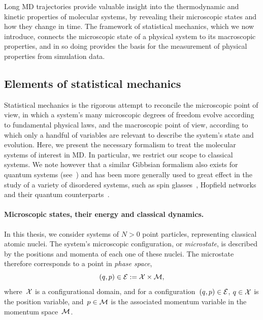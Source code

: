 Long MD trajectories provide valuable insight into the thermodynamic and kinetic properties of molecular systems, by revealing their microscopic states and how they change in time.
The framework of statistical mechanics, which we now introduce, connects the microscopic state of a physical system to its macroscopic properties, and in so doing provides the basis for the measurement of physical properties from simulation data.

\subsection{Elements of statistical mechanics}
Statistical mechanics is the rigorous attempt to reconcile the microscopic point of view, in which a system's many microscopic degrees of freedom evolve according to fundamental physical laws, and the macroscopic point of view, according to which only a handful of variables are relevant to describe the system's state and evolution.
Here, we present the necessary formalism to treat the molecular systems of interest in MD. In particular, we restrict our scope to classical systems.
We note however that a similar Gibbsian formalism also exists for quantum systems (see~\cite{F72}) and has been more generally used to great effect in the study of a variety of disordered systems, such as spin glasses~\cite{EA75}, Hopfield networks~\cite{P84} and their quantum counterparts~\cite{RY96,RMGLM18}.

\paragraph{Microscopic states, their energy and classical dynamics.}
In this thesis, we consider systems of $N>0$ point particles, representing classical atomic nuclei.
The system's microscopic configuration, or \textit{microstate}, is described by the positions and momenta of each one of these nuclei. The microstate therefore corresponds to a point in \textit{phase space}, 
\begin{equation}
    \label{eq:01:phase_space}
    (q,p)\in \mathcal{E} := \mathcal{X}\times \mathcal{M},
\end{equation}
where~$\mathcal{X}$ is a configurational domain, and for a configuration~$(q,p)\in\mathcal{E}$, $q\in\mathcal{X}$ is the position variable, and~$p\in \mathcal{M}$ is the associated momentum variable in the momentum space~$\mathcal{M}$.

